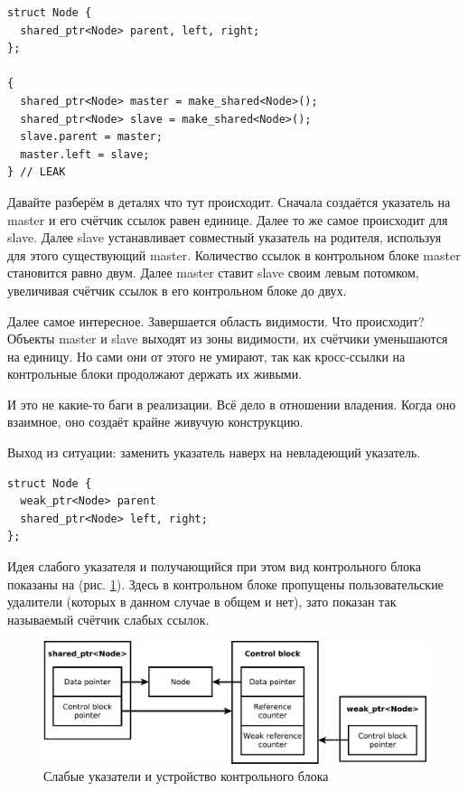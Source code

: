 \documentclass[a4paper,12pt,oneside]{article}
\begin{document}
\begin{lstlisting}
struct Node {
  shared_ptr<Node> parent, left, right;
};

{
  shared_ptr<Node> master = make_shared<Node>();
  shared_ptr<Node> slave = make_shared<Node>();
  slave.parent = master;
  master.left = slave;
} // LEAK
\end{lstlisting}

Давайте разберём в деталях что тут происходит. Сначала создаётся указатель на master и его счётчик ссылок равен единице. Далее то же самое происходит для slave. Далее slave устанавливает совместный указатель на родителя, используя для этого существующий master. Количество ссылок в контрольном блоке master становится равно двум. Далее master ставит slave своим левым потомком, увеличивая счётчик ссылок в его контрольном блоке до двух.

Далее самое интересное. Завершается область видимости. Что происходит? Объекты master и slave выходят из зоны видимости, их счётчики уменьшаются на единицу. Но сами они от этого не умирают, так как кросс-ссылки на контрольные блоки продолжают держать их живыми.

И это не какие-то баги в реализации. Всё дело в отношении владения. Когда оно взаимное, оно создаёт крайне живучую конструкцию.

Выход из ситуации: заменить указатель наверх на невладеющий указатель.

\begin{lstlisting}
struct Node {
  weak_ptr<Node> parent
  shared_ptr<Node> left, right;
};
\end{lstlisting}

Идея слабого указателя и получающийся при этом вид контрольного блока показаны на (рис. \ref{fig:smartptrs-weak-outer}). Здесь в контрольном блоке пропущены пользовательские удалители (которых в данном случае в общем и нет), зато показан так называемый счётчик слабых ссылок.

\begin{figure}[ht]
\centering
\includegraphics[width=1.0\textwidth]{illustrations/smartptrs-weak-outer-crop.pdf}
\caption{Слабые указатели и устройство контрольного блока}
\label{fig:smartptrs-weak-outer}
\end{figure}
\end{document}

